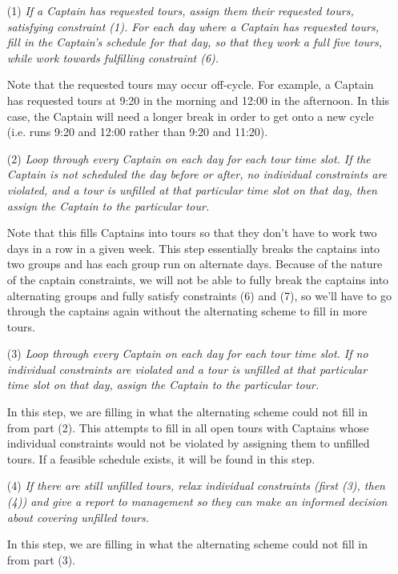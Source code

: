 \documentclass[12pt]{article}
\begin{document}
\begin{itemize}
\item[(1)] \textit{If a Captain has requested tours, assign them their requested tours, satisfying constraint (1). For each day where a Captain has requested tours, fill in the Captain's schedule for that day, so that they work a full five tours, while work towards fulfilling constraint (6).}

Note that the requested tours may occur off-cycle. For example, a Captain has requested tours at 9:20 in the morning and 12:00 in the afternoon. In this case, the Captain will need a longer break in order to get onto a new cycle (i.e. runs 9:20 and 12:00 rather than 9:20 and 11:20). 

\item[(2)] \textit{Loop through every Captain on each day for each tour time slot. If the Captain is not scheduled the day before or after, no individual constraints are violated, and a tour is unfilled at that particular time slot on that day, then assign the Captain to the particular tour.}

Note that this fills Captains into tours so that they don't have to work two days in a row in a given week. This step essentially breaks the captains into two groups and has each group run on alternate days. Because of the nature of the captain constraints, we will not be able to fully break the captains into alternating groups and fully satisfy constraints (6) and (7), so we'll have to go through the captains again without the alternating scheme to fill in more tours.

\item[(3)] \textit{Loop through every Captain on each day for each tour time slot. If no individual constraints are violated and a tour is unfilled at that particular time slot on that day, assign the Captain to the particular tour.}

In this step, we are filling in what the alternating scheme could not fill in from part (2). This attempts to fill in all open tours with Captains whose individual constraints would not be violated by assigning them to unfilled tours. If a feasible schedule exists, it will be found in this step.

\item[(4)] \textit{If there are still unfilled tours, relax individual constraints  (first (3), then (4)) and give a report to management so they can make an informed decision about covering unfilled tours.}

In this step, we are filling in what the alternating scheme could not fill in from part (3).
\end{itemize}
\end{document}
